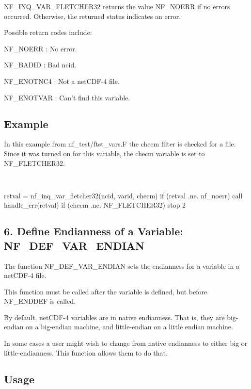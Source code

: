 N\+F\+\_\+\+I\+N\+Q\+\_\+\+V\+A\+R\+\_\+\+F\+L\+E\+T\+C\+H\+E\+R32 returns the value N\+F\+\_\+\+N\+O\+E\+RR if no errors occurred. Otherwise, the returned status indicates an error.

Possible return codes include\+:

{\ttfamily N\+F\+\_\+\+N\+O\+E\+RR} \+: No error.

{\ttfamily N\+F\+\_\+\+B\+A\+D\+ID} \+: Bad ncid.

{\ttfamily N\+F\+\_\+\+E\+N\+O\+T\+N\+C4} \+: Not a net\+C\+D\+F-\/4 file.

{\ttfamily N\+F\+\_\+\+E\+N\+O\+T\+V\+AR} \+: Can’t find this variable.

\subsection*{Example }

In this example from nf\+\_\+test/ftst\+\_\+vars.\+F the checm filter is checked for a file. Since it was turned on for this variable, the checm variable is set to N\+F\+\_\+\+F\+L\+E\+T\+C\+H\+E\+R32.

 

\begin{DoxyVerb}  retval = nf_inq_var_fletcher32(ncid, varid, checm)
  if (retval .ne. nf_noerr) call handle_err(retval)
  if (checm .ne. NF_FLETCHER32) stop 2
\end{DoxyVerb}


\subsection*{6. Define Endianness of a Variable\+: {\ttfamily N\+F\+\_\+\+D\+E\+F\+\_\+\+V\+A\+R\+\_\+\+E\+N\+D\+I\+AN} }

The function N\+F\+\_\+\+D\+E\+F\+\_\+\+V\+A\+R\+\_\+\+E\+N\+D\+I\+AN sets the endianness for a variable in a net\+C\+D\+F-\/4 file.

This function must be called after the variable is defined, but before N\+F\+\_\+\+E\+N\+D\+D\+EF is called.

By default, net\+C\+D\+F-\/4 variables are in native endianness. That is, they are big-\/endian on a big-\/endian machine, and little-\/endian on a little endian machine.

In some cases a user might wish to change from native endianness to either big or little-\/endianness. This function allows them to do that.

\subsection*{Usage }

